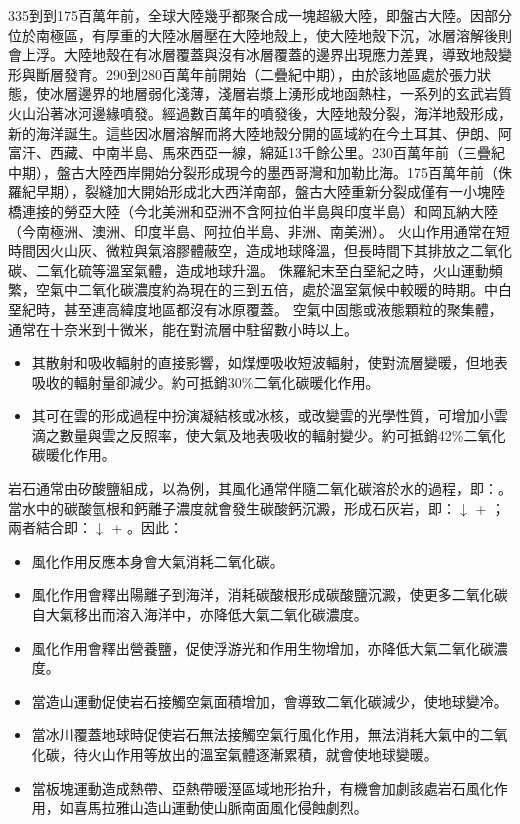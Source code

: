\documentclass[a4paper,12pt]{report}
\begin{document}
335到到175百萬年前，全球大陸幾乎都聚合成一塊超級大陸，即盤古大陸。因部分位於南極區，有厚重的大陸冰層壓在大陸地殼上，使大陸地殼下沉，冰層溶解後則會上浮。大陸地殼在有冰層覆蓋與沒有冰層覆蓋的邊界出現應力差異，導致地殼變形與斷層發育。290到280百萬年前開始（二疊紀中期），由於該地區處於張力狀態，使冰層邊界的地層弱化淺薄，淺層岩漿上湧形成地函熱柱，一系列的玄武岩質火山沿著冰河邊緣噴發。經過數百萬年的噴發後，大陸地殼分裂，海洋地殼形成，新的海洋誕生。這些因冰層溶解而將大陸地殼分開的區域約在今土耳其、伊朗、阿富汗、西藏、中南半島、馬來西亞一線，綿延13千餘公里。230百萬年前（三疊紀中期），盤古大陸西岸開始分裂形成現今的墨西哥灣和加勒比海。175百萬年前（侏羅紀早期），裂縫加大開始形成北大西洋南部，盤古大陸重新分裂成僅有一小塊陸橋連接的勞亞大陸（今北美洲和亞洲不含阿拉伯半島與印度半島）和岡瓦納大陸（今南極洲、澳洲、印度半島、阿拉伯半島、非洲、南美洲）。
火山作用通常在短時間因火山灰、微粒與氣溶膠體蔽空，造成地球降溫，但長時間下其排放之二氧化碳、二氧化硫等溫室氣體，造成地球升溫。
侏羅紀末至白堊紀之時，火山運動頻繁，空氣中二氧化碳濃度約為現在的三到五倍，處於溫室氣候中較暖的時期。中白堊紀時，甚至連高緯度地區都沒有冰原覆蓋。
空氣中固態或液態顆粒的聚集體，通常在十奈米到十微米，能在對流層中駐留數小時以上。
\begin{itemize}
\item 其散射和吸收輻射的直接影響，如煤煙吸收短波輻射，使對流層變暖，但地表吸收的輻射量卻減少。約可抵銷30\%二氧化碳暖化作用。
\item 其可在雲的形成過程中扮演凝結核或冰核，或改變雲的光學性質，可增加小雲滴之數量與雲之反照率，使大氣及地表吸收的輻射變少。約可抵銷42\%二氧化碳暖化作用。
\end{itemize}
岩石通常由矽酸鹽組成，以為例，其風化通常伴隨二氧化碳溶於水的過程，即：。當水中的碳酸氫根和鈣離子濃度就會發生碳酸鈣沉澱，形成石灰岩，即：$\downarrow$ + ；兩者結合即：$\downarrow$ + 。因此：
\begin{itemize}
\item 風化作用反應本身會大氣消耗二氧化碳。
\item 風化作用會釋出陽離子到海洋，消耗碳酸根形成碳酸鹽沉澱，使更多二氧化碳自大氣移出而溶入海洋中，亦降低大氣二氧化碳濃度。
\item 風化作用會釋出營養鹽，促使浮游光和作用生物增加，亦降低大氣二氧化碳濃度。
\item 當造山運動促使岩石接觸空氣面積增加，會導致二氧化碳減少，使地球變冷。
\item 當冰川覆蓋地球時促使岩石無法接觸空氣行風化作用，無法消耗大氣中的二氧化碳，待火山作用等放出的溫室氣體逐漸累積，就會使地球變暖。
\item 當板塊運動造成熱帶、亞熱帶暖溼區域地形抬升，有機會加劇該處岩石風化作用，如喜馬拉雅山造山運動使山脈南面風化侵蝕劇烈。
\end{itemize}
\end{document}
